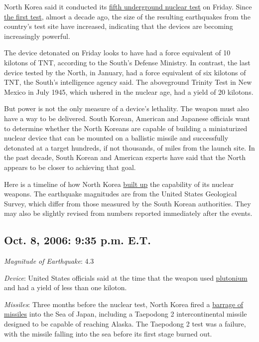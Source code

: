 North Korea said it conducted its
\href{http://www.nytimes.com/2016/09/09/world/asia/north-korea-nuclear-test.html}{fifth
underground nuclear test} on Friday. Since
\href{http://www.nytimes.com/2006/10/09/world/asia/09korea.html}{the
first test}, almost a decade ago, the size of the resulting earthquakes
from the country's test site have increased, indicating that the devices
are becoming increasingly powerful.

The device detonated on Friday looks to have had a force equivalent of
10 kilotons of TNT, according to the South's Defense Ministry. In
contrast, the last device tested by the North, in January, had a force
equivalent of six kilotons of TNT, the South's intelligence agency said.
The aboveground Trinity Test in New Mexico in July 1945, which ushered
in the nuclear age, had a yield of 20 kilotons.

But power is not the only measure of a device's lethality. The weapon
must also have a way to be delivered. South Korean, American and
Japanese officials want to determine whether the North Koreans are
capable of building a miniaturized nuclear device that can be mounted on
a ballistic missile and successfully detonated at a target hundreds, if
not thousands, of miles from the launch site. In the past decade, South
Korean and American experts have said that the North appears to be
closer to achieving that goal.

Here is a timeline of how North Korea
\href{http://www.nytimes.com/2016/09/10/world/asia/north-korea-nuclear-test-statement.html}{built
up} the capability of its nuclear weapons. The earthquake magnitudes are
from the United States Geological Survey, which differ from those
measured by the South Korean authorities. They may also be slightly
revised from numbers reported immediately after the events.

\hypertarget{oct-8-2006-935-pm-et}{%
\subsection{Oct. 8, 2006: 9:35 p.m. E.T.}\label{oct-8-2006-935-pm-et}}

\emph{Magnitude of Earthquake}: 4.3

\emph{Device}: United States officials said at the time that the weapon
used
\href{http://www.nytimes.com/2006/10/17/world/asia/17diplo.html}{plutonium}
and had a yield of less than one kiloton.

\emph{Missiles}: Three months before the nuclear test, North Korea fired
a
\href{http://www.nytimes.com/2006/07/05/world/asia/05missile.html}{barrage
of missiles} into the Sea of Japan, including a Taepodong 2
intercontinental missile designed to be capable of reaching Alaska. The
Taepodong 2 test was a failure, with the missile falling into the sea
before its first stage burned out.

